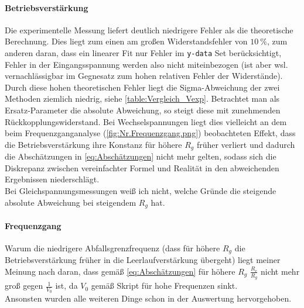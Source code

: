 \paragraph{Betriebsverstärkung}
Die experimentelle Messung liefert deutlich niedrigere Fehler als die theoretische Berechnung. Dies liegt zum einen am großen Widerstandsfehler von \(\qty{10}{\percent}\), zum anderen daran, dass ein linearer Fit nur Fehler im \verb|y-data| Set berücksichtigt, Fehler in der Eingangsspannung werden also nicht miteinbezogen (ist aber wsl. vernachlässigbar im Gegnesatz zum hohen relativen Fehler der Widerstände). Durch diese hohen theoretischen Fehler liegt die Sigma-Abweichung der zwei Methoden ziemlich niedrig, siehe \cref{table:Vergleich_Vexp}. Betrachtet man als Ersatz-Parameter die absolute Abweichung, so steigt diese mit zunehmenden Rückkopplungswiderstand. Bei Wechselspannungen liegt dies vielleicht an dem beim Frequenzganganalyse (\cref{fig:Nr.Frequenzgang.png}) beobachteten Effekt, dass die Betriebsverstärkung ihre Konstanz für höhere \(R_g\) früher verliert und dadurch die Abschätzungen in \cref{eq:Abschätzungen} nicht mehr gelten, sodass sich die Diskrepanz zwischen vereinfachter Formel und Realität in den abweichenden Ergebnissen niederschlägt.\\
Bei Gleichspannungsmessungen weiß ich nicht, welche Gründe die steigende absolute Abweichung bei steigendem \(R_g\) hat.

\paragraph{Frequenzgang}
Warum die niedrigere Abfallsgrenzfrequenz (dass für höhere \(R_g\) die Betriebsverstärkung früher in die Leerlaufverstärkung übergeht) liegt meiner Meinung nach daran, dass gemäß \cref{eq:Abschätzungen} für höhere \(R_g\) \(\frac{R_e}{R_g}\) nicht mehr groß gegen \(\frac{1}{V_0}\) ist, da \(V_0\) gemäß Skript\autocite{Skript_2.2} für hohe Frequenzen sinkt.\\
Ansonsten wurden alle weiteren Dinge schon in der Auswertung hervorgehoben. 

